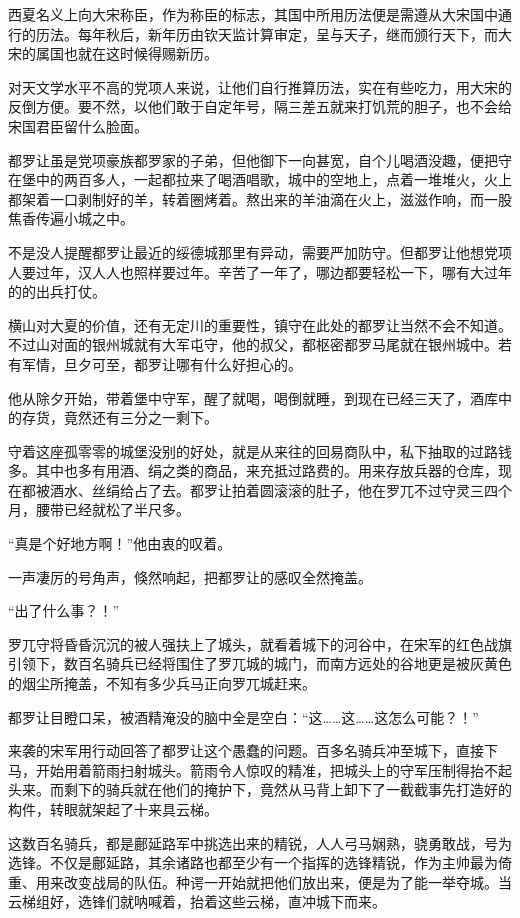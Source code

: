 西夏名义上向大宋称臣，作为称臣的标志，其国中所用历法便是需遵从大宋国中通行的历法。每年秋后，新年历由钦天监计算审定，呈与天子，继而颁行天下，而大宋的属国也就在这时候得赐新历。

对天文学水平不高的党项人来说，让他们自行推算历法，实在有些吃力，用大宋的反倒方便。要不然，以他们敢于自定年号，隔三差五就来打饥荒的胆子，也不会给宋国君臣留什么脸面。

都罗让虽是党项豪族都罗家的子弟，但他御下一向甚宽，自个儿喝酒没趣，便把守在堡中的两百多人，一起都拉来了喝酒唱歌，城中的空地上，点着一堆堆火，火上都架着一口剥制好的羊，转着圈烤着。熬出来的羊油滴在火上，滋滋作响，而一股焦香传遍小城之中。

不是没人提醒都罗让最近的绥德城那里有异动，需要严加防守。但都罗让他想党项人要过年，汉人人也照样要过年。辛苦了一年了，哪边都要轻松一下，哪有大过年的的出兵打仗。

横山对大夏的价值，还有无定川的重要性，镇守在此处的都罗让当然不会不知道。不过山对面的银州城就有大军屯守，他的叔父，都枢密都罗马尾就在银州城中。若有军情，旦夕可至，都罗让哪有什么好担心的。

他从除夕开始，带着堡中守军，醒了就喝，喝倒就睡，到现在已经三天了，酒库中的存货，竟然还有三分之一剩下。

守着这座孤零零的城堡没别的好处，就是从来往的回易商队中，私下抽取的过路钱多。其中也多有用酒、绢之类的商品，来充抵过路费的。用来存放兵器的仓库，现在都被酒水、丝绢给占了去。都罗让拍着圆滚滚的肚子，他在罗兀不过守灵三四个月，腰带已经就松了半尺多。

“真是个好地方啊！”他由衷的叹着。

一声凄厉的号角声，倏然响起，把都罗让的感叹全然掩盖。

“出了什么事？！”

罗兀守将昏昏沉沉的被人强扶上了城头，就看着城下的河谷中，在宋军的红色战旗引领下，数百名骑兵已经将围住了罗兀城的城门，而南方远处的谷地更是被灰黄色的烟尘所掩盖，不知有多少兵马正向罗兀城赶来。

都罗让目瞪口呆，被酒精淹没的脑中全是空白：“这……这……这怎么可能？！”

来袭的宋军用行动回答了都罗让这个愚蠢的问题。百多名骑兵冲至城下，直接下马，开始用着箭雨扫射城头。箭雨令人惊叹的精准，把城头上的守军压制得抬不起头来。而剩下的骑兵就在他们的掩护下，竟然从马背上卸下了一截截事先打造好的构件，转眼就架起了十来具云梯。

这数百名骑兵，都是鄜延路军中挑选出来的精锐，人人弓马娴熟，骁勇敢战，号为选锋。不仅是鄜延路，其余诸路也都至少有一个指挥的选锋精锐，作为主帅最为倚重、用来改变战局的队伍。种谔一开始就把他们放出来，便是为了能一举夺城。当云梯组好，选锋们就呐喊着，抬着这些云梯，直冲城下而来。


